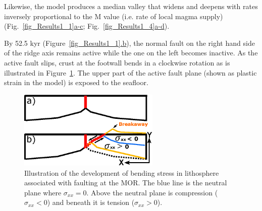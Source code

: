 Likewise, the model produces a median valley that widens and deepens with rates inversely proportional to the M value (i.e. rate of local magma supply) (Fig.~\hyperref[fig_Results1_1]{\ref{fig_Results1_1}a-c}; Fig.~\hyperref[fig_Results1_4]{\ref{fig_Results1_4}a-d}).  %


By 52.5 kyr (Figure~\hyperref[fig_Results1_1]{\ref{fig_Results1_1}.b}), the normal fault on the right hand side of the ridge axis remains active while the one on the left becomes inactive. As the active fault slips, crust at the footwall bends in a clockwise rotation as is illustrated in Figure~\hyperref[fig_Results4_8]{\ref{fig_Results4_8}}. %
The upper part of the active fault plane (shown as plastic strain in the model) is exposed to the seafloor.
\begin{figure}[h]
   \centering
     \includegraphics[width=0.6\textwidth]{./Figures/fig_Results4_8_sqrt_cut_back_bending_cartoon.eps}
   \caption{Illustration of the development of bending stress in lithosphere associated with faulting at the MOR. The blue line is the neutral plane where $\sigma_{xx}=0$. Above the neutral plane is compression ($\sigma_{xx}<0$) and beneath it is tension ($\sigma_{xx}>0$).}
  \label{fig_Results4_8}
\end{figure}

